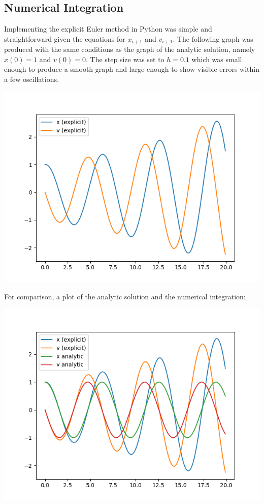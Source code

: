 \documentclass{article}
\begin{document}
\subsection{Numerical Integration}
Implementing the explicit Euler method in Python was simple and straightforward given the equations for $x_{i+1}$ and $v_{i+1}$. The following graph was produced with the same conditions as the graph of the analytic solution, namely $ x(0) = 1 $ and $ v(0) = 0 $. The step size was set to $ h = 0.1 $ which was small enough to produce a smooth graph and large enough to show visible errors within a few oscillations.

\includegraphics[scale=0.9]{images/explicit_solution.png}

For comparison, a plot of the analytic solution and the numerical integration:

\includegraphics[scale=0.9]{images/analytic_vs_explicit.png}
\end{document}
